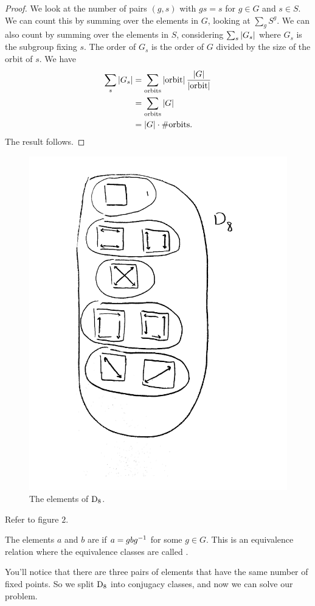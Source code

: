 \documentclass[11pt, oneside]{amsart}
\begin{document}
\begin{proof}
We look at the number of pairs $(g,s)$ with $gs=s$ for $g\in G$ and $s\in S$. We can count this by summing over the elements in $G$, looking at $\sum_g S^g$. We can also count by summing over the elements in $S$, considering $\sum_s \left \lvert G_s \right \rvert$ where $G_s$ is the subgroup fixing $s$. The order of $G_s$ is the order of $G$ divided by the size of the orbit of $s$. We have
\begin{align*}
\sum_s \left \lvert G_s \right \rvert &= \sum_{\textrm{orbits}} \left \lvert \mathrm{orbit} \right \rvert \frac{\left \lvert G \right \rvert}{\left \lvert \mathrm{orbit} \right \rvert}\\
&= \sum_{\textrm{orbits}} \left \lvert G \right \rvert\\
&= \left \lvert G \right \rvert \cdot \# \mathrm{orbits}.
\end{align*}
The result follows.
\end{proof}
\begin{figure}
\centering
\includegraphics[scale=0.3]{images/d8}
\caption{The elements of $\operatorname{D}_8$.}
\end{figure}
Refer to figure $2$. 
\begin{definition}
The elements $a$ and $b$ are  if $a = gbg^{-1}$ for some $g\in G$. This is an equivalence relation where the equivalence classes are called .
\end{definition}
You'll notice that there are three pairs of elements that have the same number of fixed points. So we split $\operatorname{D}_8$ into conjugacy classes, and now we can solve our problem. 
\end{document}
